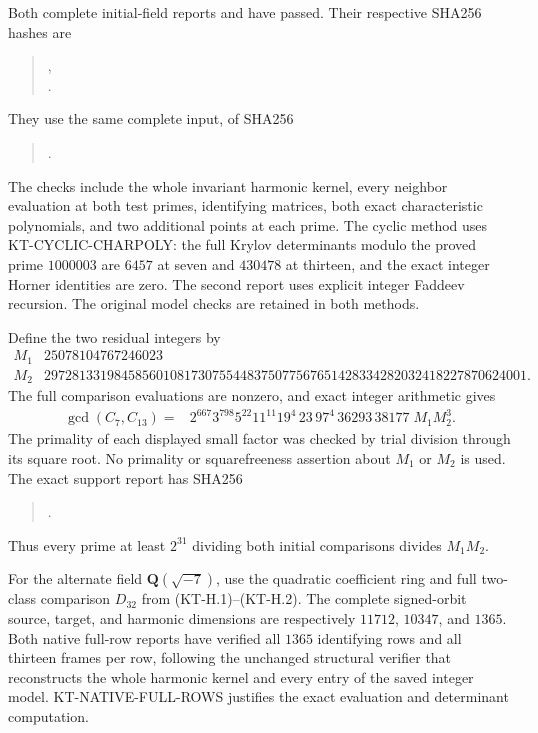 \documentclass[11pt,a4paper]{article}
\theoremstyle{definition}
\begin{document}
Both complete initial-field reports
 and
 have passed.
Their respective SHA256 hashes are
\begin{quote}\small
{},\\
.
\end{quote}
They use the same complete input, of SHA256
\begin{quote}\small
{}.
\end{quote}
The checks include the whole invariant harmonic kernel, every
neighbor evaluation at both test primes, identifying matrices,
both exact characteristic polynomials, and two additional
points at each prime.  The cyclic method uses
KT-CYCLIC-CHARPOLY: the full Krylov determinants modulo the
proved prime $1000003$ are $6457$ at seven and $430478$ at
thirteen, and the exact integer Horner identities are zero.
The second report uses explicit integer Faddeev recursion.
The original model checks are retained in both methods.

Define the two residual integers by
\[
\begin{array}{c|r}
 M_1&25078104767246023\\
 M_2&297281331984585601081730755448375077567651428334282032418227870624001.
\end{array}                                                   \tag{KN.2}
\]
The full comparison evaluations are nonzero, and exact integer
arithmetic gives
\[
\begin{split}
 \gcd(C_7,C_{13})={}&
 2^{667}3^{798}5^{22}11^{11}19^4\,23\,97^4\,36293\,38177
                         \;M_1M_2^3.
\end{split}                                                 \tag{KN.3}
\]
The primality of each displayed small factor was checked by
trial division through its square root.  No primality or
squarefreeness assertion about $M_1$ or $M_2$ is used.
The exact support report has SHA256
\begin{quote}\small
{}.
\end{quote}
Thus every prime at least $2^{31}$ dividing both initial
comparisons divides $M_1M_2$.

For the alternate field $\mathbf Q(\sqrt{-7})$, use the
quadratic coefficient ring and full two-class comparison
$D_{32}$ from (KT-H.1)--(KT-H.2).  The complete signed-orbit
source, target, and harmonic dimensions are respectively
$11712$, $10347$, and $1365$.  Both native full-row reports
have verified all $1365$ identifying rows and all thirteen
frames per row, following the unchanged structural verifier
that reconstructs the whole harmonic kernel and every entry
of the saved integer model.  KT-NATIVE-FULL-ROWS justifies
the exact evaluation and determinant computation.
\end{document}
